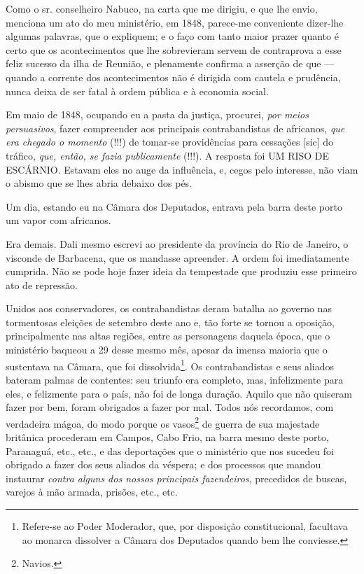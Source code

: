 Como o sr. conselheiro Nabuco, na carta que me dirigiu, e que lhe envio,
menciona um ato do meu ministério, em 1848, parece-me conveniente
dizer-lhe algumas palavras, que o expliquem; e o faço com tanto maior
prazer quanto é certo que os acontecimentos que lhe sobrevieram servem
de contraprova a esse feliz sucesso da ilha de Reunião, e plenamente
confirma a asserção de que --- quando a corrente dos acontecimentos não
é dirigida com cautela e prudência, nunca deixa de ser fatal à ordem
pública e à economia social.

Em maio de 1848, ocupando eu a pasta da justiça, procurei, \emph{por
meios persuasivos}, fazer compreender aos principais contrabandistas de
africanos, \emph{que era chegado o momento} (!!!) de tomar-se
providências para cessações {[}sic{]} do tráfico, \emph{que, então, se
fazia publicamente} (!!!). A resposta foi UM RISO DE ESCÁRNIO. Estavam
eles no auge da influência, e, cegos pelo interesse, não viam o abismo
que se lhes abria debaixo dos pés.

Um dia, estando eu na Câmara dos Deputados, entrava pela barra deste
porto um vapor com africanos.

Era demais. Dali mesmo escrevi ao presidente da província do Rio de
Janeiro, o visconde de Barbacena, que os mandasse apreender. A ordem foi
imediatamente cumprida. Não se pode hoje fazer ideia da tempestade que
produziu esse primeiro ato de repressão.

Unidos aos conservadores, os contrabandistas deram batalha ao governo
nas tormentosas eleições de setembro deste ano e, tão forte se tornou a
oposição, principalmente nas altas regiões, entre as personagens daquela
época, que o ministério baqueou a 29 desse mesmo mês, apesar da imensa
maioria que o sustentava na Câmara, que foi dissolvida\footnote{
  Refere-se ao Poder Moderador, que, por disposição constitucional,
  facultava ao monarca dissolver a Câmara dos Deputados quando bem lhe
  conviesse.}. Os contrabandistas e seus aliados bateram palmas de
contentes: seu triunfo era completo, mas, infelizmente para eles, e
felizmente para o país, não foi de longa duração. Aquilo que não
quiseram fazer por bem, foram obrigados a fazer por mal. Todos nós
recordamos, com verdadeira mágoa, do modo porque os vasos\footnote{
  Navios.} de guerra de sua majestade britânica procederam em Campos,
Cabo Frio, na barra mesmo deste porto, Paranaguá, etc., etc., e das
deportações que o ministério que nos sucedeu foi obrigado a fazer dos
seus aliados da véspera; e dos processos que mandou instaurar
\emph{contra alguns dos nossos principais fazendeiros}, precedidos de
buscas, varejos à mão armada, prisões, etc., etc.

